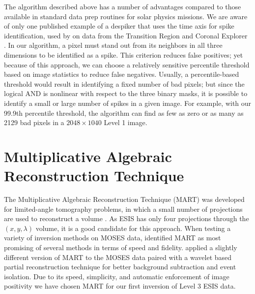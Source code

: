 The algorithm described above has a number of advantages compared to those available in standard data prep routines for solar physics missions. 
We are aware of only one published example of a despiker that uses the time axis for spike identification, used by \citet{Aschwanden2000(trace_unspike_time)} on data from the Transition Region and Coronal Explorer \citep[TRACE]{handy1999}. 
In our algorithm, a pixel must stand out from its neighbors in all three dimensions to be identified as a spike.
This criterion reduces false positives; yet because of this approach, we can choose a relatively sensitive percentile threshold based on image statistics to reduce false negatives. 
Usually, a percentile-based threshold would result in identifying a fixed number of bad pixels; but since the logical AND is nonlinear with respect to the three binary masks, it is possible to identify a small or large number of spikes in a given image. 
For example, with our 99.9th percentile threshold, the algorithm can find as few as zero or as many as 2129 bad pixels in a $2048\times 1040$ Level 1 image. 

\section{Multiplicative Algebraic Reconstruction Technique}\label{MART}
	The Multiplicative Algebraic Reconstruction Technique (MART) was developed for limited-angle tomography problems, in which a small number of projections are used to reconstruct a volume \citep{Okamoto1991,Verhoeven1993}. 
	As ESIS has only four projections through the $(x,y,\lambda)$ volume, it is a good candidate for this approach.
	When testing a variety of inversion methods on MOSES data, \citet{FoxPhD} identified MART as most promising of several methods in terms of speed and fidelity.
	\citet{RustPhD} applied a slightly different version of MART to the MOSES data paired with a wavelet based partial reconstruction technique for better background subtraction and event isolation.
	Due to its speed, simplicity, and automatic enforcement of image positivity we have chosen MART for our first inversion of Level 3 ESIS data.
	
